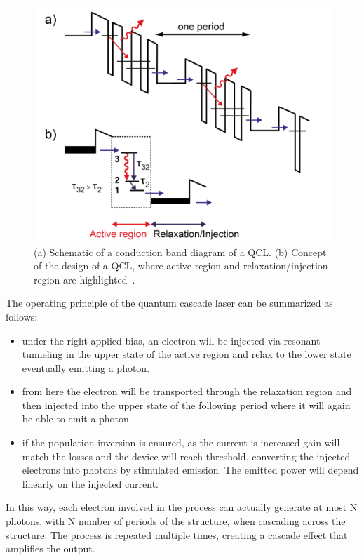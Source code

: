 \documentclass[prl,twocolumn]{revtex4-1}
\begin{document}
\begin{figure}[!t]
    \centering
    \includegraphics[width=1\linewidth]{Images/QCL.png}
    \caption{(a) Schematic of a conduction band diagram of a QCL. (b) Concept of the design of a QCL, where active region and relaxation/injection region are highlighted~\cite{qcl_lasers}.}
    \label{fig:QCL}
\end{figure}

The operating principle of the quantum cascade laser can be summarized as follows:

\begin{itemize}
    \item under the right applied bias, an electron will be injected via resonant tunneling in the upper state of the active region and relax to the lower state eventually emitting a photon.
    \item from here the electron will be transported through the relaxation region and then injected into the upper state of the following period where it will again be able to emit a photon.
    \item if the population inversion is ensured, as the current is increased gain will match the losses and the device will reach threshold, converting the injected electrons into photons by stimulated emission. The emitted power will depend linearly on the injected current.
\end{itemize}
In this way, each electron involved in the process can actually generate at most N photons, with N number of periods of the structure, when cascading across the structure. The process is repeated multiple times, creating a cascade effect that amplifies the output.
\end{document}
